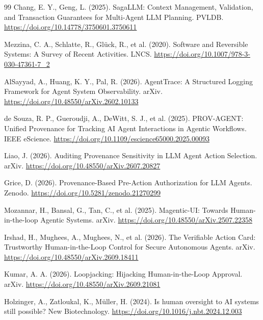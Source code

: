\documentclass[11pt]{article}
\begin{document}
\begin{thebibliography}{99}
 Chang, E. Y., Geng, L. (2025). SagaLLM: Context Management,
Validation, and Transaction Guarantees for Multi-Agent LLM Planning. PVLDB.
\url{https://doi.org/10.14778/3750601.3750611}

 Mezzina, C. A., Schlatte, R., Glück, R., et al.
(2020). Software and Reversible Systems: A Survey of Recent Activities. LNCS.
\url{https://doi.org/10.1007/978-3-030-47361-7_2}

 AlSayyad, A., Huang, K. Y., Pal, R. (2026). AgentTrace: A
Structured Logging Framework for Agent System Observability. arXiv.
\url{https://doi.org/10.48550/arXiv.2602.10133}

 de Souza, R. P., Gueroudji, A., DeWitt, S. J., et al.
(2025). PROV-AGENT: Unified Provenance for Tracking AI Agent Interactions in
Agentic Workflows. IEEE eScience.
\url{https://doi.org/10.1109/escience65000.2025.00093}

 Liao, J. (2026). Auditing Provenance Sensitivity in
LLM Agent Action Selection. arXiv.
\url{https://doi.org/10.48550/arXiv.2607.20827}

 Grice, D. (2026). Provenance-Based Pre-Action
Authorization for LLM Agents. Zenodo.
\url{https://doi.org/10.5281/zenodo.21270299}

 Mozannar, H., Bansal, G., Tan, C., et al. (2025).
Magentic-UI: Towards Human-in-the-loop Agentic Systems. arXiv.
\url{https://doi.org/10.48550/arXiv.2507.22358}

 Irshad, H., Mughees, A., Mughees, N., et al. (2026). The
Verifiable Action Card: Trustworthy Human-in-the-Loop Control for Secure
Autonomous Agents. arXiv. \url{https://doi.org/10.48550/arXiv.2609.18411}

 Kumar, A. A. (2026). Loopjacking: Hijacking
Human-in-the-Loop Approval. arXiv.
\url{https://doi.org/10.48550/arXiv.2609.21081}

 Holzinger, A., Zatloukal, K., Müller, H. (2024). Is human
oversight to AI systems still possible? New Biotechnology.
\url{https://doi.org/10.1016/j.nbt.2024.12.003}

\end{thebibliography}
\end{document}
